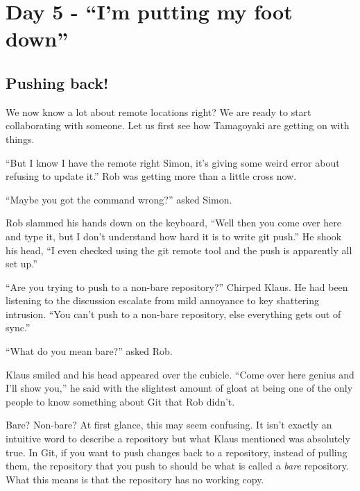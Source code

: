 \section{Day 5 - ``I'm putting my foot down''}
\subsection{Pushing back!}
We now know a lot about remote locations right? We are ready to start collaborating with someone.
Let us first see how Tamagoyaki are getting on with things.

\begin{trenches}
``But I know I have the remote right Simon, it's giving some weird error about refusing to update it.''
Rob was getting more than a little cross now.

``Maybe you got the command wrong?'' asked Simon.

Rob slammed his hands down on the keyboard,
``Well then you come over here and type it, but I don't understand how hard it is to write git push.''
He shook his head, ``I even checked using the git remote tool and the push is apparently all set up.''

``Are you trying to push to a non-bare repository?'' Chirped Klaus.
He had been listening to the discussion escalate from mild annoyance to key shattering intrusion.
``You can't push to a non-bare repository, else everything gets out of sync.''

``What do you mean bare?'' asked Rob.

Klaus smiled and his head appeared over the cubicle.
``Come over here genius and I'll show you,'' he said with the slightest amount of gloat at being one of the only people to know something about Git that Rob didn't.
\end{trenches}

Bare? Non-bare? At first glance, this may seem confusing.
It isn't exactly an intuitive word to describe a repository but what Klaus mentioned was absolutely true.
In Git, if you want to push changes back to a repository, instead of pulling them, the repository that you push to should be what is called a \emph{bare} repository.
What this means is that the repository has no working copy.

